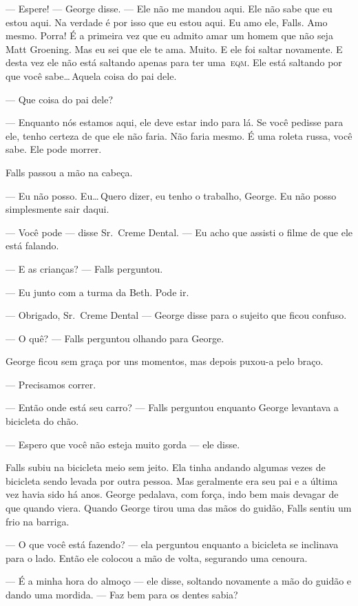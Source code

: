 --- Espere! --- George disse. --- Ele não me mandou aqui. Ele não sabe que eu estou aqui. Na verdade é por isso que eu estou aqui. Eu amo ele, Falls. Amo mesmo. Porra! É a primeira vez que eu admito amar um homem que não seja Matt Groening. Mas eu sei que ele te ama. Muito. E ele foi saltar novamente. E desta vez ele não está saltando apenas para ter uma~\textsc{eqm}. Ele está saltando por que você sabe\ldots\,Aquela coisa do pai dele.

--- Que coisa do pai dele?

--- Enquanto nós estamos aqui, ele deve estar indo para lá. Se você pedisse para ele, tenho certeza de que ele não faria. Não faria mesmo. É uma roleta russa, você sabe. Ele pode morrer.

Falls passou a mão na cabeça.

--- Eu não posso. Eu\ldots\,Quero dizer, eu tenho o trabalho, George. Eu não posso simplesmente sair daqui.

--- Você pode --- disse Sr.~Creme Dental. --- Eu acho que assisti o filme de que ele está falando.

--- E as crianças? --- Falls perguntou.

--- Eu junto com a turma da Beth. Pode ir.

--- Obrigado, Sr.~Creme Dental --- George disse para o sujeito\mudanca{,} que ficou confuso.

--- O quê? --- Falls perguntou olhando para George.

George ficou sem graça por uns momentos, mas depois puxou-a pelo braço.

--- Precisamos correr.

--- Então onde está seu carro? --- Falls perguntou\mudanca{,} enquanto George levantava a bicicleta do chão.

--- Espero que você não esteja muito gorda --- ele disse.

Falls subiu na bicicleta meio sem jeito. Ela tinha andando algumas vezes de bicicleta sendo levada por outra pessoa. Mas geralmente era seu pai\mudanca{,} e a última vez havia sido há anos. George pedalava, com força, indo bem mais devagar de que quando viera. Quando George tirou uma das mãos do guidão, Falls sentiu um frio na barriga.

--- O que você está fazendo? --- ela perguntou\mudanca{,} enquanto a bicicleta se inclinava para o lado. Então ele colocou a mão de volta, segurando uma cenoura.

--- É a minha hora do almoço --- ele disse, soltando novamente a mão do guidão e dando uma mordida. --- Faz bem para os dentes\mudanca{,} sabia?

